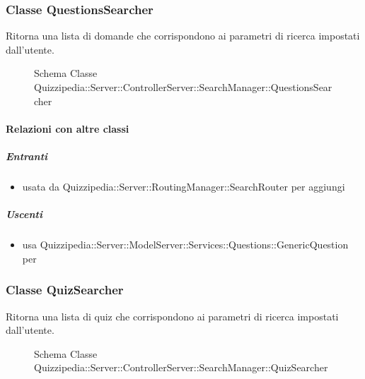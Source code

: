 \subsubsection{Classe QuestionsSearcher}
Ritorna una lista di domande che corrispondono ai parametri di ricerca impostati dall'utente.
\begin{figure}[H]
\centering
\noindent{}
\caption[Schema Classe QuestionsSearcher]{Schema Classe Quizzipedia::Server::ControllerServer::SearchManager::QuestionsSearcher}
\end{figure}
\paragraph{Relazioni con altre classi}
\subparagraph{Entranti}
\begin{itemize}
\item usata da Quizzipedia::Server::RoutingManager::SearchRouter per aggiungi
\end{itemize}
\subparagraph{Uscenti}
\begin{itemize}
\item usa Quizzipedia::Server::ModelServer::Services::Questions::GenericQuestion per 
\end{itemize}
\subsubsection{Classe QuizSearcher}
Ritorna una lista di quiz che corrispondono ai parametri di ricerca impostati dall'utente.
\begin{figure}[H]
\centering
\noindent{}
\caption[Schema Classe QuizSearcher]{Schema Classe Quizzipedia::Server::ControllerServer::SearchManager::QuizSearcher}
\end{figure}
